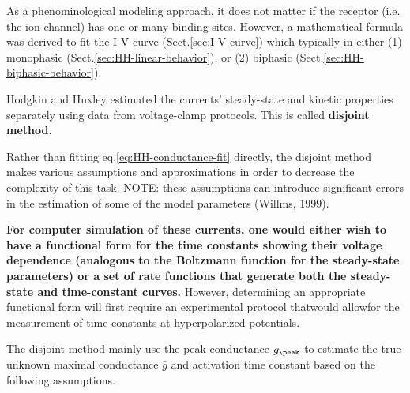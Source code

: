 As a phenominological modeling approach, it does not matter if the receptor
(i.e. the ion channel) has one or many binding sites. However, a mathematical
formula was derived to fit the I-V curve (Sect.\ref{sec:I-V-curve}) which
typically in either (1) monophasic (Sect.\ref{sec:HH-linear-behavior}), or (2)
biphasic (Sect.\ref{sec:HH-biphasic-behavior}).

Hodgkin and Huxley estimated the currents' steady-state
and kinetic properties separately using data from voltage-clamp protocols. This
is called {\bf disjoint method}.

Rather than fitting eq.\ref{eq:HH-conductance-fit} directly, the disjoint method
makes various assumptions and approximations in order to decrease the complexity
of this task. NOTE: these assumptions can introduce significant errors in the
estimation of some of the model parameters (Willms, 1999).

\begin{mdframed}

{\bf For computer simulation of these currents, one would either wish to have a
functional form for the time constants showing their voltage dependence
(analogous to the Boltzmann function for the steady-state parameters) or a set
of rate functions that generate both the steady-state and time-constant curves.}
However, determining an appropriate functional form will first require an
experimental protocol thatwould allowfor the measurement of time constants at
hyperpolarized potentials.

\end{mdframed}

The disjoint method mainly use the peak conductance $g_\peak$ to estimate the
true unknown maximal conductance $\bar{g}$ and activation time constant based on
the following assumptions.

